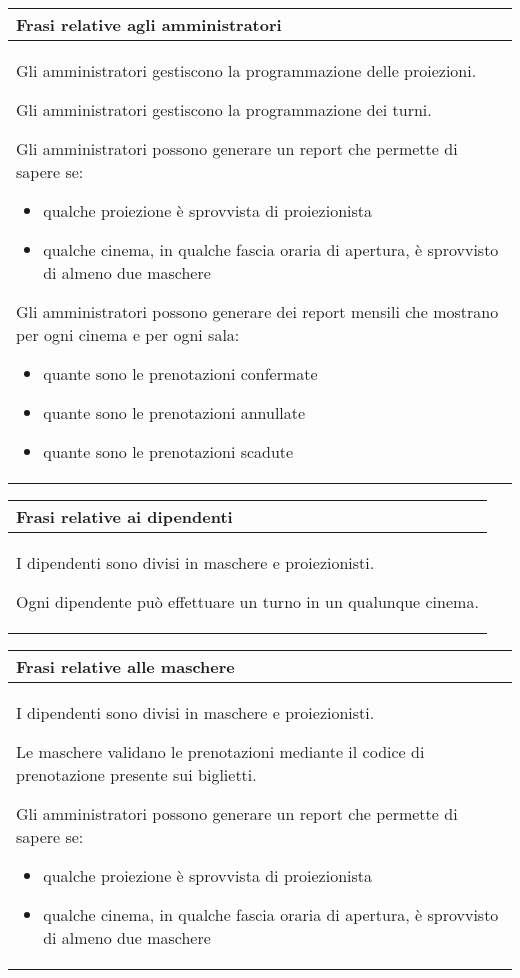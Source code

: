 \begin{tabularx}{\linewidth}{|X|}
      \hline
      \rowcolor{tblhdrcolor}
      \textbf{Frasi relative agli amministratori} \\\hline
      Gli amministratori gestiscono la programmazione delle proiezioni.

      Gli amministratori gestiscono la programmazione dei turni.

      Gli amministratori possono generare un report che permette di
      sapere se:
      \begin{itemize}
            \item qualche proiezione è sprovvista di proiezionista
            \item qualche cinema, in qualche fascia oraria di apertura,
                  è sprovvisto di almeno due maschere
      \end{itemize}

      Gli amministratori possono generare dei report mensili che
      mostrano per ogni cinema e per ogni sala:
      \begin{itemize}
            \item quante sono le prenotazioni confermate
            \item quante sono le prenotazioni annullate
            \item quante sono le prenotazioni scadute
      \end{itemize}
      \\ \hline
\end{tabularx}

\begin{tabularx}{\linewidth}{|X|}
      \hline
      \rowcolor{tblhdrcolor}
      \textbf{Frasi relative ai dipendenti} \\\hline
      I dipendenti sono divisi in maschere e proiezionisti.

      Ogni dipendente può effettuare un turno in un qualunque cinema.
      \\ \hline
\end{tabularx}

\begin{tabularx}{\linewidth}{|X|}
      \hline
      \rowcolor{tblhdrcolor}
      \textbf{Frasi relative alle maschere} \\\hline
      I dipendenti sono divisi in maschere e proiezionisti.

      Le maschere validano le prenotazioni mediante il codice
      di prenotazione presente sui biglietti.

      Gli amministratori possono generare un report che permette di
      sapere se:
      \begin{itemize}
            \item qualche proiezione è sprovvista di proiezionista
            \item qualche cinema, in qualche fascia oraria di apertura,
                  è sprovvisto di almeno due maschere
      \end{itemize}
      \\ \hline
\end{tabularx}

